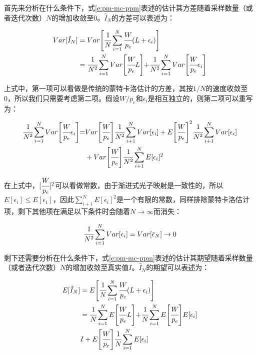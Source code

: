首先来分析在什么条件下，式\ref{e:pm-mc-ppm}表述的估计其方差随着采样数量（或者迭代次数）$N$的增加收敛至0。$\hat{I}_N$的方差可以表述为：

\begin{equation}
\begin{aligned}
	Var[\hat{I}_N]&=Var\Biggl[ \cfrac{1}{N}\sum^{N}_{i=1} \cfrac{W}{p_e}(L+\epsilon_i) \Biggl]\\
	&= \cfrac{1}{N^{2}}\sum^{N}_{i=1}Var\Biggl[ \cfrac{W}{p_e}L \Biggl]+ \cfrac{1}{N^{2}}\sum^{N}_{i=1}Var\Biggl[ \cfrac{W}{p_e}\epsilon_i \Biggl]
\end{aligned}
\end{equation}

\noindent 上式中，第一项可以看做是传统的蒙特卡洛估计的方差，其按$1/N$的速度收敛至0，所以我们只需要考虑第二项。假设$W/p_e$和$\epsilon_i$是相互独立的，则第二项可以重写为：

\begin{equation}
\begin{aligned}
	 \cfrac{1}{N^{2}}\sum^{N}_{i=1}Var\Biggl[ \cfrac{W}{p_e}\epsilon_i \Biggl]=&Var\Biggl[ \cfrac{W}{p_e}\Biggl] \cfrac{1}{N^{2}}\sum^{N}_{i+1}Var[\epsilon_i]+E\Biggl[ \cfrac{W}{p_e}\Biggl]^{2} \cfrac{1}{N^{2}}\sum^{N}_{i+1}Var[\epsilon_i]\\
	&+Var\Biggl[ \cfrac{W}{p_e}\Biggl] \cfrac{1}{N^{2}}\sum^{N}_{i+1}E[\epsilon_i]^{2}
\end{aligned}
\end{equation}

\noindent 在上式中，$[ \cfrac{W}{p_e}]^{2}$可以看做常数，由于渐进式光子映射是一致性的，所以$E[\epsilon_i]\leq E[\epsilon_1]$，因此$\sum^{N}_{i+1}E[\epsilon_i]^{2}$是一个有限的常数，同样排除蒙特卡洛估计项，剩下其他项在满足以下条件时会随着$N\to\infty$而消失：

\begin{equation}
	 \cfrac{1}{N^{2}}\sum^{N}_{i=1}Var[\epsilon_i]=Var[\bar{\epsilon}_N]\to 0
\end{equation}

剩下还需要分析在什么条件下，式\ref{e:pm-mc-ppm}表述的估计其期望随着采样数量（或者迭代次数）$N$的增加收敛至真实值$I$。$\hat{I}_N$的期望可以表述为：

\begin{equation}
\begin{aligned}
	E[\hat{I}_N]&=E\Biggl[  \cfrac{1}{N}\sum^{N}_{i=1} \cfrac{W}{p_e}(L+\epsilon_i) \Biggl]\\
	&= \cfrac{1}{N}\sum^{N}_{i=1}E\Biggl[ \cfrac{W}{p_e}L\Biggl]+  \cfrac{1}{N}\sum^{N}_{i=1}E\Biggl[ \cfrac{W}{p_e}\Biggl]E[\epsilon_i]\\
	&I+E\Biggl[ \cfrac{W}{p_e}\Biggl] \cfrac{1}{N}\sum^{N}_{i=1}E[\epsilon_i]
\end{aligned}
\end{equation}

